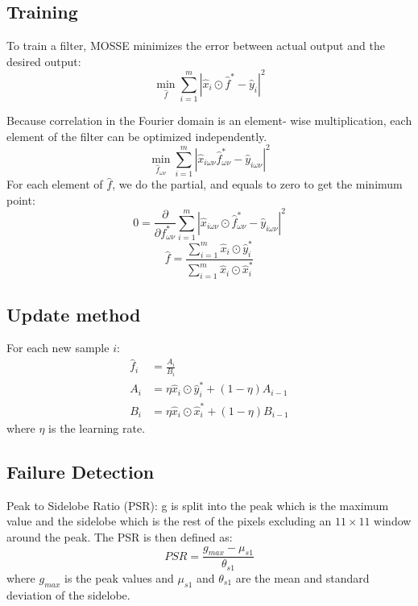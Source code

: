 \documentclass[12pt]{article}
\numberwithin{equation}{section}
\begin{document}
\subsection{Training}
To train a filter, MOSSE minimizes the error between actual output and the desired output:
\begin{equation} \label{eq:mossetarget}
	\min_{\hat{f}} \sum_{i=1}^{m} |\hat{x}_i \odot \hat{f}^* - \hat{y}_i|^2
\end{equation} \par
Because correlation in the Fourier domain is an element- wise multiplication, each element of the filter can be optimized independently.
\begin{equation}
	\min_{\hat{f}_{\omega \nu}}\sum_{i=1}^{m}|\hat{x}_{i\omega \nu}  \hat{f}^*_{\omega \nu} - \hat{y}_{i\omega \nu}|^2
\end{equation} 
For each element of $\hat{f}$, we do the partial, and equals to zero to get the minimum point:
\begin{equation}
	0= \frac{\partial}{\partial f^*_{\omega \nu}}\sum_{i=1}^{m}|\hat{x}_{i\omega \nu} \odot \hat{f}^*_{\omega \nu} - \hat{y}_{i\omega \nu}|^2
\end{equation} 
\begin{equation}
	\hat{f}= \frac{\sum_{i=1}^{m}\hat{x}_i \odot \hat{y}^*_i }{\sum_{i=1}^{m}\hat{x}_i \odot \hat{x}^*_i}
\end{equation} 
\subsection{Update method}
For each new sample $i$:
\begin{align}
	\hat{f}_i &= \frac{A_i}{B_i} \\
	A_i &= \eta \hat{x}_i \odot \hat{y}_i^* + (1-\eta)A_{i-1} \\
	B_i &= \eta\hat{x}_i\odot \hat{x}_i^* + (1-\eta)B_{i-1}
\end{align}
where $\eta$ is the learning rate.

\subsection{Failure Detection}
Peak to Sidelobe Ratio (PSR): g is split into the peak which is the maximum value and the sidelobe which
is the rest of the pixels excluding an $11 \times 11$ window around the peak. The PSR is then defined as:
\begin{equation}
	PSR = \frac{g_{max}-\mu_{s1}}{\theta_{s1}}
\end{equation}
where $g_{max}$ is the peak values and $\mu_{s1}$ and $\theta_{s1}$ are the mean and standard deviation of the sidelobe. \par
\end{document}
